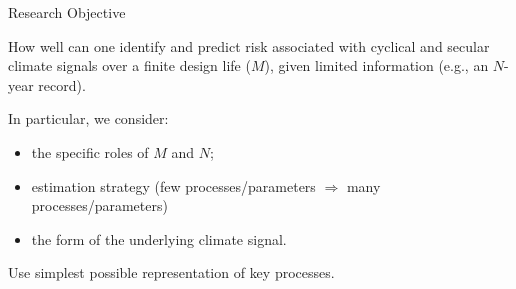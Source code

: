 \documentclass[
  10pt,     %
  handout   %
]{beamer}
\makeatletter
\newcommand*{\eg}{e.g.\@\xspace}
\makeatother
\begin{document}
\begin{frame}{Research Objective}
  \begin{alertblock}{How well can one identify and predict risk}
     associated with cyclical and secular climate signals over a finite design life ($M$),  given limited information (\eg, an $N$-year record).
  \end{alertblock}
  \pause
  In particular, we consider:
  \begin{itemize}
    \item the specific roles of $M$ and $N$;
    \pause
    \item estimation strategy (few processes/parameters $\Rightarrow$ many processes/parameters)
    \pause
    \item the form of the underlying climate signal.
  \end{itemize}
  \pause
  Use simplest possible representation of key processes.
\end{frame}
\end{document}
